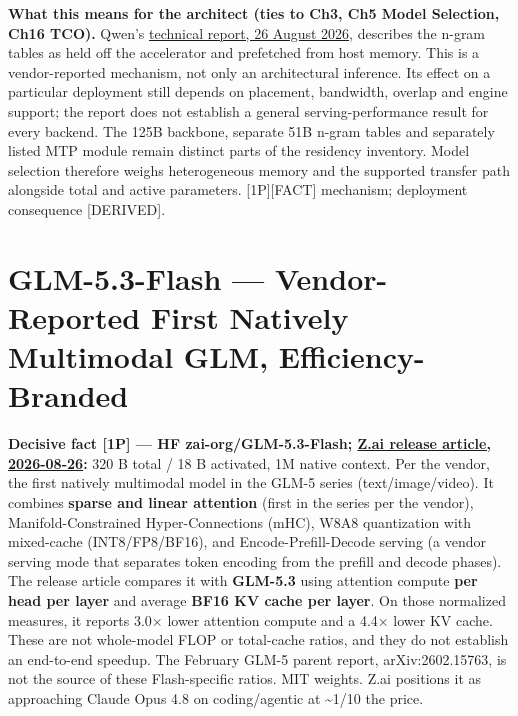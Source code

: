 \textbf{What this means for the architect (ties to Ch3, Ch5 Model
Selection, Ch16 TCO).} Qwen's
\href{https://github.com/QwenLM/Qwen3.8-Flash-Next/blob/69885871a64393807d988b27b1b5e380e8f28526/tech_report.pdf}{technical
report, 26 August 2026}, describes the n-gram tables as held off the
accelerator and prefetched from host memory. This is a vendor-reported
mechanism, not only an architectural inference. Its effect on a
particular deployment still depends on placement, bandwidth, overlap and
engine support; the report does not establish a general
serving-performance result for every backend. The 125B backbone,
separate 51B n-gram tables and separately listed MTP module remain
distinct parts of the residency inventory. Model selection therefore
weighs heterogeneous memory and the supported transfer path alongside
total and active parameters. \mbox{{[}1P{]}}\hspace{0pt}\mbox{{[}FACT{]}} mechanism; deployment
consequence \mbox{{[}DERIVED{]}}.

\section{GLM-5.3-Flash --- Vendor-Reported First Natively Multimodal
GLM,
Efficiency-Branded}\label{glm-5.3-flash-vendor-reported-first-natively-multimodal-glm-efficiency-branded}

\textbf{Decisive fact \mbox{{[}1P{]}} --- HF zai-org/GLM-5.3-Flash;
\href{https://z.ai/blog/glm-5.3-flash}{Z.ai release article,
2026-08-26}:} 320 B total / 18 B activated, 1M native context. Per the
vendor, the first natively multimodal model in the GLM-5 series
(text/image/video). It combines \textbf{sparse and linear attention}
(first in the series per the vendor), Manifold-Constrained
Hyper-Connections (mHC), W8A8 quantization with mixed-cache
(INT8/FP8/BF16), and Encode-Prefill-Decode serving (a vendor serving
mode that separates token encoding from the prefill and decode phases).
The release article compares it with \textbf{GLM-5.3} using attention
compute \textbf{per head per layer} and average \textbf{BF16 KV cache
per layer}. On those normalized measures, it reports 3.0× lower
attention compute and a 4.4× lower KV cache. These are not whole-model
FLOP or total-cache ratios, and they do not establish an end-to-end
speedup. The February GLM-5 parent report, arXiv:2602.15763, is not the
source of these Flash-specific ratios. MIT weights. Z.ai positions it as
approaching Claude Opus 4.8 on coding/agentic at \textasciitilde1/10 the
price.

